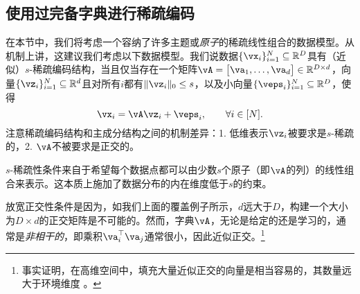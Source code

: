 \documentclass[../../book-main.tex]{subfiles}
\begin{document}
%

\subsection{使用过完备字典进行稀疏编码} 

在本节中，我们将考虑一个容纳了许多主题或\textit{原子}的稀疏线性组合的数据模型。从机制上讲，这建议我们考虑以下数据模型。我们说数据\(\{\vx_{i}\}_{i = 1}^{N} \subseteq \R^{D}\)具有（近似）\(s\)-稀疏编码结构，当且仅当存在一个矩阵\(\vA = \mat{\va_{1}, \dots, \va_{d}} \in \R^{D \times d}\)，向量\(\{\vz_{i}\}_{i = 1}^{N} \subseteq \R^{d}\)且对所有\(i\)都有\(\norm{\vz_{i}}_{0} \leq s\)，以及小向量\(\{\veps_{i}\}_{i = 1}^{N} \subseteq \R^{D}\)，使得
\begin{equation}\label{eq:vectorized_sparse_dl_dgp}
    \vx_{i} = \vA\vz_{i} + \veps_{i}, \qquad \forall i \in [N].
\end{equation}
注意稀疏编码结构和主成分结构之间的机制差异：1. 低维表示\(\vz_{i}\)被要求是\(s\)-稀疏的，2. \(\vA\)不被要求是正交的。

\(s\)-稀疏性条件来自于希望每个数据点都可以由少数\(s\)个原子（即\(\vA\)的列）的线性组合来表示。这本质上施加了数据分布的内在维度低于\(s\)的约束。

放宽正交性条件是因为，如我们上面的覆盖例子所示，\(d\)远大于\(D\)，构建一个大小为\(D \times d\)的正交矩阵是不可能的。然而，字典\(\vA\)，无论是给定的还是学习的，通常是\textit{非相干的}，即乘积\(\va_{i}^{\top}\va_{j}\)通常很小，因此近似正交。\footnote{事实证明，在高维空间中，填充大量近似正交的向量是相当容易的，其数量远大于环境维度 \cite{Wright-Ma-2022}。}
\end{document}
